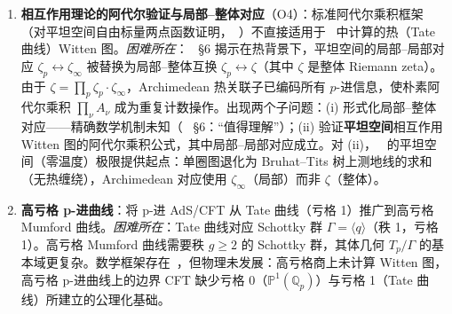 \documentclass[11pt,a4paper]{ctexart}
\theoremstyle{remark}
\newcommand{\Qp}{\mathbb{Q}_p}
\newcommand{\Pone}{\mathbb{P}^1}
\newcommand{\Tp}{T_p}
\newcommand{\BirTits}{Bruhat--Tits}
\begin{document}
\begin{enumerate}[leftmargin=2em]
    \textit{(B) 交换图分析} [$\checkmark$ 结构性分解已完成；链接因子计算尚待]。该猜想覆盖接触图；交换图有根本不同的结构：$\sum_{z_1, z_2} K_1 K_2 \, G_\Delta(z_1, z_2) \, K_3 K_4$。结构性分析（命题~\ref{prop:exchange}）揭示，当 $z_1$ 与 $z_2$ 位于不同子树（由 Steiner 路径分隔）时，传播子\textbf{分解}：$G_\Delta(z_1, z_2) = p^{-\Delta\,d(z_1,S_1)} \cdot p^{-\Delta L} \cdot p^{-\Delta\,d(S_2,z_2)}$。双重求和然后分解为两个单顶点子求和的乘积，每个产生 3 个 $\zeta_p$ 因子——共\textbf{至少 6 个 $\zeta_p$ 因子}（$6 + |R_{\mathrm{link}}|$），其中链接因子 $R_{\mathrm{link}}$ 计及 Steiner 路径的侧分支递归。在 Archimedean 一侧，谱表示将交换图分解为两个 3 点函数（每个通过星-三角给出 3 个 $\zeta_\infty$）加 1 个 $\zeta_\infty$-型因子来自谱密度——共\textbf{7 个 $\zeta_\infty$ 因子}（注~\ref{rem:exch-arch}）。交换图失配\textbf{在猜想意义上为零}，尚待验证 $|R_{\mathrm{link}}| = 1$（推论~\ref{cor:exchange}、注~\ref{rem:link-caveat}）。\textit{剩余工作}：(i) 通过互斥且穷尽的情形划分严格求值 $R_{\mathrm{link}}$；(ii) 在小树（如有限截断 $R$ 的 $T_2$）上数值验证以确认 $|R_{\mathrm{link}}| = 1$。

    此外，该猜想应在~\cite{HSYZ20} 归一化下检验，其中两点阿代尔乘积非平凡（$\zeta(2\Delta)$ 而非 1），以验证 bulk-sum 障碍在不同归一化下仍然成立。

    \item \textbf{相互作用理论的阿代尔验证与局部--整体对应}（O4）：标准阿代尔乘积框架（对平坦空间自由标量两点函数证明，~\cite{HSYZ20}）不直接适用于~\cite{HJ24} 中计算的热（Tate 曲线）Witten 图。\textit{困难所在}：~\cite{HJ24} \S6 揭示在热背景下，平坦空间的局部--局部对应 $\zeta_p \leftrightarrow \zeta_\infty$ 被替换为局部--整体互换 $\zeta_p \leftrightarrow \zeta$（其中 $\zeta$ 是整体 Riemann zeta）。由于 $\zeta = \prod_p \zeta_p \cdot \zeta_\infty$，Archimedean 热关联子已编码所有 $p$-进信息，使朴素阿代尔乘积 $\prod_\nu A_\nu$ 成为重复计数操作。出现两个子问题：(i) 形式化局部--整体对应——精确数学机制未知（~\cite{HJ24} \S6：``值得理解''）；(ii) 验证\textbf{平坦空间}相互作用 Witten 图的阿代尔乘积公式，其中局部--局部对应成立。对 (ii)，~\cite{HJ24} 的平坦空间（零温度）极限提供起点：单圈图退化为 \BirTits{} 树上测地线的求和（无热缠绕），Archimedean 对应使用 $\zeta_\infty$（局部）而非 $\zeta$（整体）。

    \item \textbf{高亏格 p-进曲线}：将 p-进 AdS/CFT 从 Tate 曲线（亏格 1）推广到高亏格 Mumford 曲线。\textit{困难所在}：Tate 曲线对应 Schottky 群 $\Gamma = \langle q \rangle$（秩 1，亏格 1）。高亏格 Mumford 曲线需要秩 $g \geq 2$ 的 Schottky 群，其体几何 $\Tp/\Gamma$ 的基本域更复杂。数学框架存在~\cite{Mum72}，但物理未发展：高亏格商上未计算 Witten 图，高亏格 p-进曲线上的边界 CFT 缺少亏格 0（$\Pone(\Qp)$）与亏格 1（Tate 曲线）所建立的公理化基础。


\end{enumerate}
\end{document}
